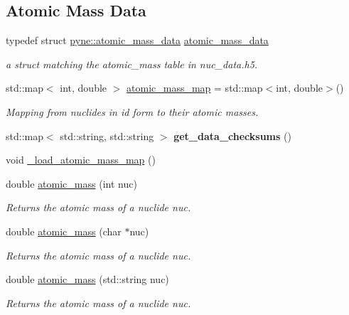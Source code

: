 \subsection*{Atomic Mass Data}
\begin{DoxyCompactItemize}
\item 
\mbox{\label{namespacepyne_a4d33f77321c43a895b32c56b0c4b9256}} 
typedef struct \hyperlink{structpyne_1_1atomic__mass__data}{pyne\+::atomic\+\_\+mass\+\_\+data} \hyperlink{namespacepyne_a4d33f77321c43a895b32c56b0c4b9256}{atomic\+\_\+mass\+\_\+data}
\begin{DoxyCompactList}\small\item\em a struct matching the atomic\+\_\+mass table in nuc\+\_\+data.\+h5. \end{DoxyCompactList}\item 
\mbox{\label{namespacepyne_ad57b70e4dd814b1efc458ff58641bcef}} 
std\+::map$<$ int, double $>$ \hyperlink{namespacepyne_ad57b70e4dd814b1efc458ff58641bcef}{atomic\+\_\+mass\+\_\+map} = std\+::map$<$int, double$>$()
\begin{DoxyCompactList}\small\item\em Mapping from nuclides in id form to their atomic masses. \end{DoxyCompactList}\item 
\mbox{\label{namespacepyne_a7ffac869653ccaac71a565704630ae43}} 
std\+::map$<$ std\+::string, std\+::string $>$ {\bfseries get\+\_\+data\+\_\+checksums} ()
\item 
void \hyperlink{namespacepyne_afc84ecca5a23b416bd3bf42b0756e68e}{\+\_\+load\+\_\+atomic\+\_\+mass\+\_\+map} ()
\item 
double \hyperlink{namespacepyne_aaab79c2417fc60c1a248dd702403befb}{atomic\+\_\+mass} (int nuc)
\begin{DoxyCompactList}\small\item\em Returns the atomic mass of a nuclide {\itshape nuc}. \end{DoxyCompactList}\item 
\mbox{\label{namespacepyne_a070a35bbdb0217ff8c4b222572912f87}} 
double \hyperlink{namespacepyne_a070a35bbdb0217ff8c4b222572912f87}{atomic\+\_\+mass} (char $\ast$nuc)
\begin{DoxyCompactList}\small\item\em Returns the atomic mass of a nuclide {\itshape nuc}. \end{DoxyCompactList}\item 
\mbox{\label{namespacepyne_a42514c3a14ce0ed7b91da7d742210ceb}} 
double \hyperlink{namespacepyne_a42514c3a14ce0ed7b91da7d742210ceb}{atomic\+\_\+mass} (std\+::string nuc)
\begin{DoxyCompactList}\small\item\em Returns the atomic mass of a nuclide {\itshape nuc}. \end{DoxyCompactList}\end{DoxyCompactItemize}
